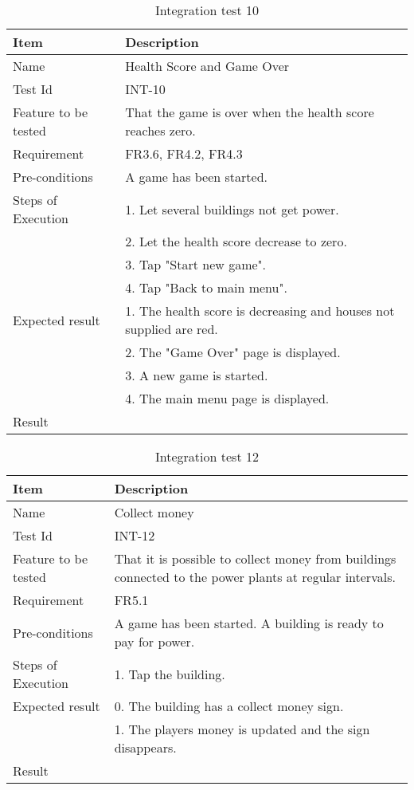 \begin{table}[H]
\centering
	\begin{tabular}{ l | p{8cm} }
		\hline
		{\bf Item} & {\bf Description} \\ \hline
		Name & Health Score and Game Over \\ 
		Test Id & INT-10 \\ 
		Feature to be tested & That the game is over when the health score reaches zero. \\ 
		Requirement & FR3.6, FR4.2, FR4.3 \\ 
		Pre-conditions & A game has been started.\\ 
		Steps of Execution & 1. Let several buildings not get power. \\ 
		& 2. Let the health score decrease to zero. \\
		& 3. Tap "Start new game". \\
		& 4. Tap "Back to main menu". \\
		Expected result & 1. The health score is decreasing and houses not supplied are red. \\
		& 2. The "Game Over" page is displayed. \\
		& 3. A new game is started. \\
		& 4. The main menu page is displayed. \\
		Result & \\ 
	\end{tabular}
	\caption{Integration test 10}
\end{table}

\begin{table}[H]
\centering
	\begin{tabular}{ l | p{8cm} }
		\hline
		{\bf Item} & {\bf Description} \\ \hline
		Name & Collect money \\ 
		Test Id & INT-12 \\ 
		Feature to be tested & That it is possible to collect money from buildings connected to the power plants at regular intervals. \\
		Requirement & FR5.1 \\ 
		Pre-conditions & A game has been started. A building is ready to pay for power. \\ 
		Steps of Execution & 1. Tap the building. \\ 
		Expected result & 0. The building has a collect money sign. \\
		& 1. The players money is updated and the sign disappears. \\
		Result & \\ 
	\end{tabular}
	\caption{Integration test 12}
\end{table}

